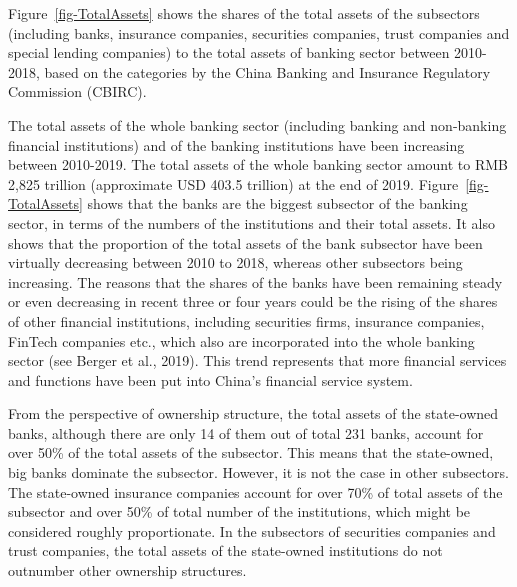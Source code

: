 \documentclass[
  letterpaper,
  DIV=11,
  numbers=noendperiod]{scrreprt}
\begin{document}
Figure~\ref{fig-TotalAssets} shows the shares of the total assets of the
subsectors (including banks, insurance companies, securities companies,
trust companies and special lending companies) to the total assets of
banking sector between 2010-2018, based on the categories by the China
Banking and Insurance Regulatory Commission (CBIRC).

The total assets of the whole banking sector (including banking and
non-banking financial institutions) and of the banking institutions have
been increasing between 2010-2019. The total assets of the whole banking
sector amount to RMB 2,825 trillion (approximate USD 403.5 trillion) at
the end of 2019. Figure~\ref{fig-TotalAssets} shows that the banks are
the biggest subsector of the banking sector, in terms of the numbers of
the institutions and their total assets. It also shows that the
proportion of the total assets of the bank subsector have been virtually
decreasing between 2010 to 2018, whereas other subsectors being
increasing. The reasons that the shares of the banks have been remaining
steady or even decreasing in recent three or four years could be the
rising of the shares of other financial institutions, including
securities firms, insurance companies, FinTech companies etc., which
also are incorporated into the whole banking sector (see Berger et al.,
2019). This trend represents that more financial services and functions
have been put into China's financial service system.

From the perspective of ownership structure, the total assets of the
state-owned banks, although there are only 14 of them out of total 231
banks, account for over 50\% of the total assets of the subsector. This
means that the state-owned, big banks dominate the subsector. However,
it is not the case in other subsectors. The state-owned insurance
companies account for over 70\% of total assets of the subsector and
over 50\% of total number of the institutions, which might be considered
roughly proportionate. In the subsectors of securities companies and
trust companies, the total assets of the state-owned institutions do not
outnumber other ownership structures.
\end{document}
